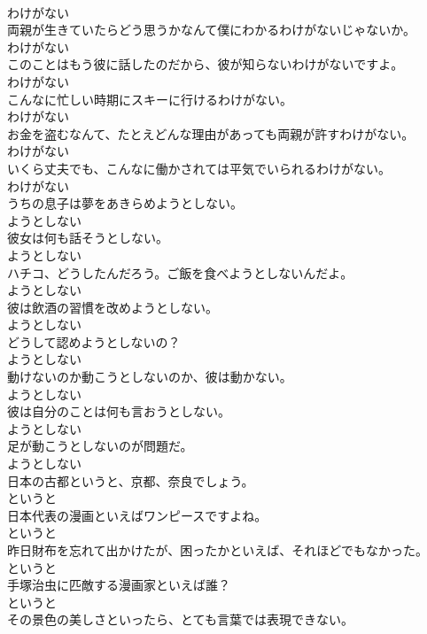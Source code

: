 \documentclass[8pt]{extreport}
\begin{document}
\begin{CJK}{UTF8}{min}
\\	わけがない	
\\	両親が生きていたらどう思うかなんて僕にわかるわけがないじゃないか。	
\\	わけがない	
\\	このことはもう彼に話したのだから、彼が知らないわけがないですよ。	
\\	わけがない	
\\	こんなに忙しい時期にスキーに行けるわけがない。	
\\	わけがない	
\\	お金を盗むなんて、たとえどんな理由があっても両親が許すわけがない。	
\\	わけがない	
\\	いくら丈夫でも、こんなに働かされては平気でいられるわけがない。	
\\	わけがない	
\\	うちの息子は夢をあきらめようとしない。	
\\	ようとしない	
\\	彼女は何も話そうとしない。	
\\	ようとしない	
\\	ハチコ、どうしたんだろう。ご飯を食べようとしないんだよ。	
\\	ようとしない	
\\	彼は飲酒の習慣を改めようとしない。	
\\	ようとしない	
\\	どうして認めようとしないの？	
\\	ようとしない	
\\	動けないのか動こうとしないのか、彼は動かない。	
\\	ようとしない	
\\	彼は自分のことは何も言おうとしない。	
\\	ようとしない	
\\	足が動こうとしないのが問題だ。	
\\	ようとしない	
\\	日本の古都というと、京都、奈良でしょう。	
\\	というと	
\\	日本代表の漫画といえばワンピースですよね。	
\\	というと	
\\	昨日財布を忘れて出かけたが、困ったかといえば、それほどでもなかった。	
\\	というと	
\\	手塚治虫に匹敵する漫画家といえば誰？	
\\	というと	
\\	その景色の美しさといったら、とても言葉では表現できない。	

\end{CJK}
\end{document}
